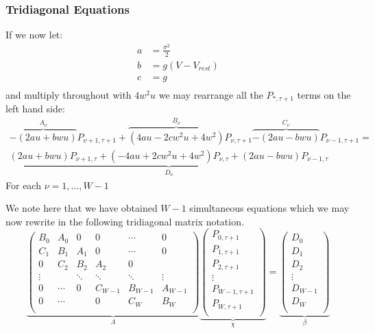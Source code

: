 \documentclass[10pt]{article}
\begin{document}
\subsubsection{Tridiagonal Equations}

If we now let:
\begin{align*}
a &= \frac{\sigma^2}{2} \\
b &= g(V - V_{rest}) \\
c &= g \\
\end{align*}
and multiply throughout with $4w^2u$
we may rearrange all the $P_{*,\tau+1} $ terms on the left hand side:
\begin{multline}
    \overbrace{-(2au+bwu)}^{A_\nu} P_{\nu+1,\tau+1} + 
    \overbrace{(4au - 2cw^2u + 4w^2)}^{B_\nu} P_{\nu,\tau+1}
    \overbrace{-(2au-bwu)}^{C_\nu} P_{\nu-1,\tau+1}
    =  \\
    \underbrace{(2au+bwu) P_{\nu+1,\tau} +  
    (-4au +2cw^2u + 4w^2) P_{\nu,\tau} + 
    (2au-bwu) P_{\nu-1,\tau}}_{D_{\nu}}
\end{multline}
For each $ \nu = 1 , \dots , W-1 $

We note here that we have obtained $W-1$ simultaneous equations which
we may now rewrite in the following tridiagonal matrix notation.
\begin{equation}
\underbrace{
\begin{pmatrix}
    B_0    & A_0   & 0      & 0      & \cdots  & 0       \\
    C_1    & B_1   & A_1    & 0      & \cdots  & 0       \\
    0      & C_2   & B_2    & A_2    & 0      &         \\
    \vdots &       & \ddots & \ddots & \ddots & \vdots  \\
    0      & \cdots & 0      & C_{W-1}& B_{W-1}& A_{W-1} \\
    0      & \cdots &        & 0      & C_W    & B_W     \\
\end{pmatrix}}_{\Lambda}
\underbrace{
\begin{pmatrix}
    P_{0,\tau+1}   \\
    P_{1,\tau+1}   \\
    P_{2,\tau+1}   \\
    \vdots         \\
    P_{W-1,\tau+1} \\
    P_{W,\tau+1}   \\
\end{pmatrix}}_{\chi}
=
\underbrace{
\begin{pmatrix}
    D_0     \\
    D_1     \\
    D_2     \\
    \vdots  \\
    D_{W-1} \\
    D_W     \\
\end{pmatrix}}_{\beta}
\end{equation}
\end{document}
